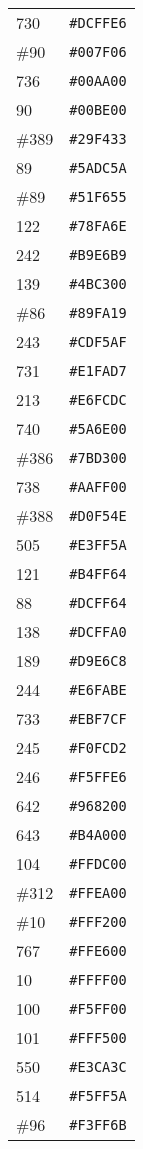 \documentclass[a4paper]{article}
\begin{document}
\begin{longtable}{|l|r|}
730 & \texttt{\#DCFFE6} \\
\#90 & \texttt{\#007F06} \\
736 & \texttt{\#00AA00} \\
90 & \texttt{\#00BE00} \\
\#389 & \texttt{\#29F433} \\
89 & \texttt{\#5ADC5A} \\
\#89 & \texttt{\#51F655} \\
122 & \texttt{\#78FA6E} \\
242 & \texttt{\#B9E6B9} \\
139 & \texttt{\#4BC300} \\
\#86 & \texttt{\#89FA19} \\
243 & \texttt{\#CDF5AF} \\
731 & \texttt{\#E1FAD7} \\
213 & \texttt{\#E6FCDC} \\
740 & \texttt{\#5A6E00} \\
\#386 & \texttt{\#7BD300} \\
738 & \texttt{\#AAFF00} \\
\#388 & \texttt{\#D0F54E} \\
505 & \texttt{\#E3FF5A} \\
121 & \texttt{\#B4FF64} \\
88 & \texttt{\#DCFF64} \\
138 & \texttt{\#DCFFA0} \\
189 & \texttt{\#D9E6C8} \\
244 & \texttt{\#E6FABE} \\
733 & \texttt{\#EBF7CF} \\
245 & \texttt{\#F0FCD2} \\
246 & \texttt{\#F5FFE6} \\
642 & \texttt{\#968200} \\
643 & \texttt{\#B4A000} \\
104 & \texttt{\#FFDC00} \\
\#312 & \texttt{\#FFEA00} \\
\#10 & \texttt{\#FFF200} \\
767 & \texttt{\#FFE600} \\
10 & \texttt{\#FFFF00} \\
100 & \texttt{\#F5FF00} \\
101 & \texttt{\#FFF500} \\
550 & \texttt{\#E3CA3C} \\
514 & \texttt{\#F5FF5A} \\
\#96 & \texttt{\#F3FF6B} \\

\end{longtable}
\end{document}
